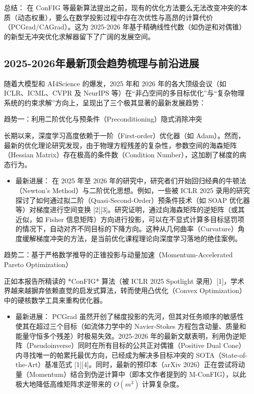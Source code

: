 \documentclass[UTF8,a4paper,12pt,fontset=none]{ctexart}
\begin{document}
总结： 在 ConFIG 等最新算法提出之前，现有的优化方法要么无法改变冲突的本质（动态权重），要么在数学投影过程中存在次优性与高昂的计算代价（PCGrad/CAGrad）。这为 2025-2026 年基于精确线性代数（如伪逆和对偶锥）的新型无冲突优化求解器留下了广阔的发展空间。




\subsection{2025-2026年最新顶会趋势梳理与前沿进展}

随着大模型和 AI4Science 的爆发，2025 年和 2026 年的各大顶级会议（如 ICLR、ICML、CVPR 及 NeurIPS 等）在“非凸空间的多目标优化”与“复杂物理系统的约束求解”方向上，呈现出了三个极其显著的最新发展趋势：


趋势一：利用二阶优化与预条件（Preconditioning）隐式消除冲突

长期以来，深度学习高度依赖于一阶（First-order）优化器（如 Adam）。然而，最新的优化理论研究发现，由于物理方程残差的复杂性，参数空间的海森矩阵（Hessian Matrix）存在极高的条件数（Condition Number），这加剧了梯度的病态行为。

\begin{itemize}
\item 最新进展： 在 2025 年至 2026 年的研究中，研究者们开始回归经典的牛顿法（Newton's Method）与二阶优化思想。例如，一些被 ICLR 2025 录用的研究探讨了如何通过拟二阶（Quasi-Second-Order）预条件技术（如 SOAP 优化器等）对梯度进行空间变换 [2][3]。研究证明，通过向海森矩阵的逆矩阵（或其近似，如 Fisher 信息矩阵）方向进行投影，可以在不显式计算多目标惩罚项的情况下，自动对齐不同目标的下降方向。这种从几何曲率（Curvature）角度缓解梯度冲突的方法，是当前优化课程理论向深度学习落地的绝佳案例。
\end{itemize}

趋势二：基于严格数学推导的正锥投影与动量加速（Momentum-Accelerated Pareto Optimization）

正如本报告所精读的 *ConFIG* 算法（被 ICLR 2025 Spotlight 录用）[1]，学术界越来越摒弃依赖直觉的启发式算法，转而使用凸优化（Convex Optimization）中的硬核数学工具来重构优化器。

\begin{itemize}
\item 最新进展： PCGrad 虽然开创了梯度投影的先河，但其对任务顺序的敏感性使其在超过三个目标（如流体力学中的 Navier-Stokes 方程包含动量、质量和能量守恒多个残差）时极易失效。2025-2026 年的最新文献表明，利用伪逆矩阵（Pseudoinverse）同时在所有目标的公共正对偶锥（Positive Dual Cone）内寻找唯一的帕累托最优方向，已经成为解决多目标冲突的 SOTA（State-of-the-Art）基准范式 [1][4]。同时，最新的预印本（arXiv 2026）正在尝试将动量（Momentum）结合到伪逆计算中（即本文作者提到的 M-ConFIG），以此极大地降低高维矩阵求逆带来的 $O(m^3)$ 计算复杂度。
\end{itemize}
\end{document}
